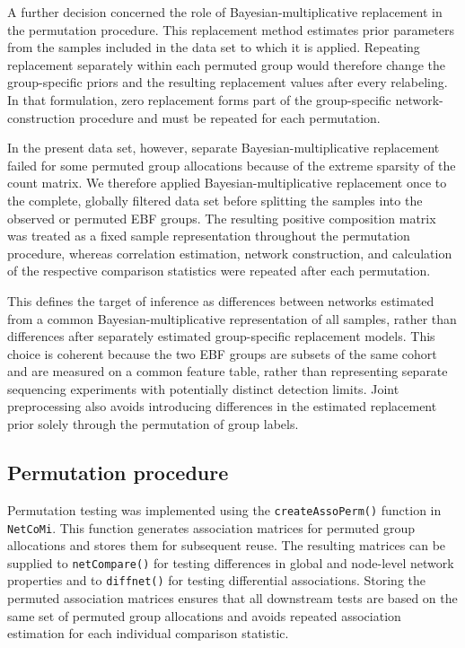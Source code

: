 A further decision concerned the role of Bayesian-multiplicative replacement in the permutation procedure. This replacement method estimates prior parameters from the samples included in the data set to which it is applied. Repeating replacement separately within each permuted group would therefore change the group-specific priors and the resulting replacement values after every relabeling. In that formulation, zero replacement forms part of the group-specific network-construction procedure and must be repeated for each permutation.

In the present data set, however, separate Bayesian-multiplicative replacement failed for some permuted group allocations because of the extreme sparsity of the count matrix. We therefore applied Bayesian-multiplicative replacement once to the complete, globally filtered data set before splitting the samples into the observed or permuted EBF groups. The resulting positive composition matrix was treated as a fixed sample representation throughout the permutation procedure, whereas correlation estimation, network construction, and calculation of the respective comparison statistics were repeated after each permutation.

This defines the target of inference as differences between networks estimated from a common Bayesian-multiplicative representation of all samples, rather than differences after separately estimated group-specific replacement models. This choice is coherent because the two EBF groups are subsets of the same cohort and are measured on a common feature table, rather than representing separate sequencing experiments with potentially distinct detection limits. Joint preprocessing also avoids introducing differences in the estimated replacement prior solely through the permutation of group labels.

\subsection{Permutation procedure}
\label{sec:7app:network:comparison:permutation}

Permutation testing was implemented using the \texttt{createAssoPerm()} function in \texttt{NetCoMi}. This function generates association matrices for permuted group allocations and stores them for subsequent reuse. The resulting matrices can be supplied to \texttt{netCompare()} for testing differences in global and node-level network properties and to \texttt{diffnet()} for testing differential associations. Storing the permuted association matrices ensures that all downstream tests are based on the same set of permuted group allocations and avoids repeated association estimation for each individual comparison statistic.

